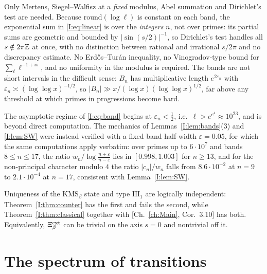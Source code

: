 \begin{remark}\label{I:rem:tools}
Only Mertens, Siegel--Walfisz at a \emph{fixed} modulus, Abel summation and Dirichlet's test
are needed. Because $\mathrm{round}(\log\ell)$ is constant on each band, the exponential sum
in \eqref{I:eq:linear} is over the \emph{integers} $n$, not over primes: its partial sums are
geometric and bounded by $|\sin(s/2)|^{-1}$, so Dirichlet's test handles all $s\notin2\pi\mathbb{Z}$
at once, with no distinction between rational and irrational $s/2\pi$ and no discrepancy
estimate. No Erd\H{o}s--Tur\'an inequality, no Vinogradov-type bound for
$\sum_\ell\ell^{-1+is}$, and no uniformity in the modulus is required. The bands are not
short intervals in the difficult sense: $B_n$ has multiplicative length $e^{2\varepsilon_n}$
with $\varepsilon_n\asymp(\log\log x)^{-1/2}$, so $|B_n|\gg x/(\log x)(\log\log x)^{1/2}$,
far above any threshold at which primes in progressions become hard.
\end{remark}

\begin{remark}\label{I:rem:numtype}
The asymptotic regime of \eqref{I:eq:band} begins at $\varepsilon_n<\tfrac12$, i.e.\
$\ell>e^{e^4}\approx10^{23}$, and is beyond direct computation. The mechanics of
Lemmas~\ref{I:lem:bands}(3) and \ref{I:lem:SW} were instead verified with a fixed band
half-width $\varepsilon=0.05$, for which the same computations apply verbatim: over primes
up to $6\cdot10^7$ and bands $8\le n\le17$, the ratio
$w_n\big/\log\frac{n+\varepsilon}{n-\varepsilon}$ lies in $[0.998,1.003]$ for $n\ge13$, and
for the non-principal character modulo $4$ the ratio $|c_n|/w_n$ falls from
$8.6\cdot10^{-2}$ at $n=9$ to $2.1\cdot10^{-4}$ at $n=17$, consistent with
Lemma~\ref{I:lem:SW}.
\end{remark}

\begin{corollary}\label{I:cor:indep}
Uniqueness of the $\mathrm{KMS}_\beta$ state and type $\mathrm{III}_1$ are logically
independent: Theorem~\ref{I:thm:counter} has the first and fails the second, while
Theorem~\ref{I:thm:classical} together with [Ch.~\ref{ch:Main}, Cor.~3.10] has both. Equivalently,
$\Xi^{\mathrm{ext}}_\beta$ can be trivial on the axis $s=0$ and nontrivial off it.
\end{corollary}

\section{The spectrum of transitions}\label{I:sec:spectrum}

